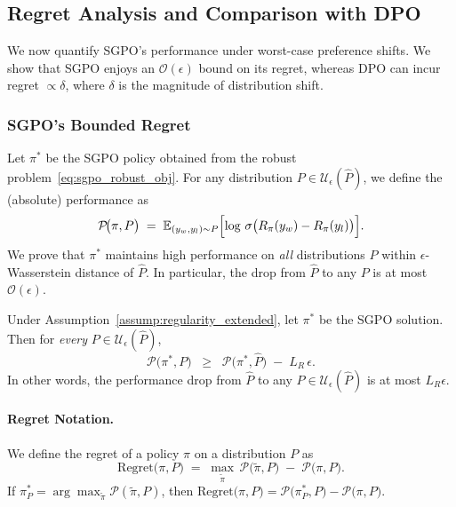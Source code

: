\subsection{Regret Analysis and Comparison with DPO}
\label{sec:regret}

We now quantify SGPO’s performance under worst-case preference shifts.  We show that SGPO enjoys an $\mathcal{O}(\epsilon)$ bound on its regret, whereas DPO can incur regret $\propto \delta$, where $\delta$ is the magnitude of distribution shift.

\subsubsection{SGPO’s Bounded Regret}
Let \(\pi^*\) be the SGPO policy obtained from the robust problem~\eqref{eq:sgpo_robust_obj}.  For any distribution \(P\in\mathcal{U}_\epsilon(\hat{P})\), we define the (absolute) performance as
\begin{equation}
\mathcal{P}\!\bigl(\pi, P\bigr)
\;=\;
\mathbb{E}_{(y_w,y_l)\sim P}
\Bigl[
  \log\,\sigma\bigl(R_{\pi}(y_w)-R_{\pi}(y_l)\bigr)
\Bigr].
\end{equation}
We prove that \(\pi^*\) maintains high performance on \emph{all} distributions \(P\) within \(\epsilon\)-Wasserstein distance of \(\hat{P}\).  In particular, the drop from \(\hat{P}\) to any \(P\) is at most \(\mathcal{O}(\epsilon)\).

\begin{theorem}
\label{thm:sgpo_regret_bound}
Under Assumption~\ref{assump:regularity_extended}, let \(\pi^*\) be the SGPO solution.  Then for \emph{every} $P\in \mathcal{U}_\epsilon(\hat{P})$,
\begin{equation}
\mathcal{P}\bigl(\pi^*,P\bigr)
\;\;\ge\;\;
\mathcal{P}\bigl(\pi^*,\hat{P}\bigr)
\;-\;
L_R\,\epsilon.
\end{equation}
In other words, the performance drop from \(\hat{P}\) to any \(P\in \mathcal{U}_\epsilon(\hat{P})\) is at most \(L_R\epsilon\).
\end{theorem}

\paragraph{Regret Notation.}
We define the regret of a policy \(\pi\) on a distribution \(P\) as
\begin{equation}
\text{Regret}\bigl(\pi,P\bigr)
\;=\;
\max_{\tilde{\pi}}\,\mathcal{P}\!\bigl(\tilde{\pi},P\bigr)
\;-\;
\mathcal{P}\!\bigl(\pi,P\bigr).
\end{equation}
If $\pi_P^*=\arg\max_{\tilde{\pi}}\mathcal{P}(\tilde{\pi},P)$, then
$\text{Regret}\bigl(\pi,P\bigr)=\mathcal{P}\bigl(\pi_P^*,P\bigr)-\mathcal{P}\bigl(\pi,P\bigr).$

